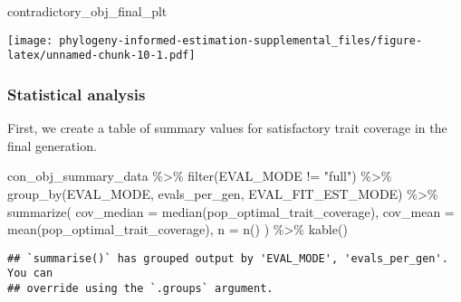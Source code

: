\documentclass[
]{book}
\newenvironment{Shaded}{\begin{snugshade}}{\end{snugshade}}
\newcommand{\AttributeTok}[1]{\textcolor[rgb]{0.77,0.63,0.00}{#1}}
\newcommand{\FunctionTok}[1]{\textcolor[rgb]{0.00,0.00,0.00}{#1}}
\newcommand{\NormalTok}[1]{#1}
\newcommand{\SpecialCharTok}[1]{\textcolor[rgb]{0.00,0.00,0.00}{#1}}
\newcommand{\StringTok}[1]{\textcolor[rgb]{0.31,0.60,0.02}{#1}}
\begin{document}
\begin{Shaded}
\begin{Highlighting}[]
\NormalTok{contradictory\_obj\_final\_plt}
\end{Highlighting}
\end{Shaded}

\texttt{[image: phylogeny-informed-estimation-supplemental\_files/figure-latex/unnamed-chunk-10-1.pdf]}

\hypertarget{statistical-analysis}{%
\subsubsection{Statistical analysis}\label{statistical-analysis}}

First, we create a table of summary values for satisfactory trait coverage in the final generation.

\begin{Shaded}
\begin{Highlighting}[]
\NormalTok{con\_obj\_summary\_data }\SpecialCharTok{\%\textgreater{}\%}
  \FunctionTok{filter}\NormalTok{(EVAL\_MODE }\SpecialCharTok{!=} \StringTok{"full"}\NormalTok{) }\SpecialCharTok{\%\textgreater{}\%}
  \FunctionTok{group\_by}\NormalTok{(EVAL\_MODE, evals\_per\_gen, EVAL\_FIT\_EST\_MODE) }\SpecialCharTok{\%\textgreater{}\%}
  \FunctionTok{summarize}\NormalTok{(}
    \AttributeTok{cov\_median =} \FunctionTok{median}\NormalTok{(pop\_optimal\_trait\_coverage),}
    \AttributeTok{cov\_mean =} \FunctionTok{mean}\NormalTok{(pop\_optimal\_trait\_coverage),}
    \AttributeTok{n =} \FunctionTok{n}\NormalTok{()}
\NormalTok{  ) }\SpecialCharTok{\%\textgreater{}\%}
  \FunctionTok{kable}\NormalTok{()}
\end{Highlighting}
\end{Shaded}

\begin{verbatim}
## `summarise()` has grouped output by 'EVAL_MODE', 'evals_per_gen'. You can
## override using the `.groups` argument.
\end{verbatim}
\end{document}
